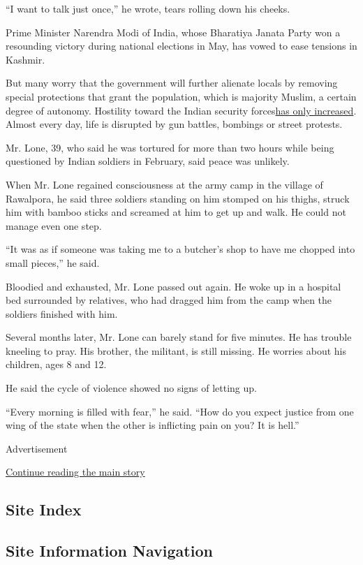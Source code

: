 ``I want to talk just once,'' he wrote, tears rolling down his cheeks.

Prime Minister Narendra Modi of India, whose Bharatiya Janata Party won
a resounding victory during national elections in May, has vowed to ease
tensions in Kashmir.

But many worry that the government will further alienate locals by
removing special protections that grant the population, which is
majority Muslim, a certain degree of autonomy. Hostility toward the
Indian security
forces\href{https://www.nytimes.com/2018/12/18/world/asia/kashmir-civilians-teenagers.html}{has
only increased}. Almost every day, life is disrupted by gun battles,
bombings or street protests.

Mr. Lone, 39, who said he was tortured for more than two hours while
being questioned by Indian soldiers in February, said peace was
unlikely.

When Mr. Lone regained consciousness at the army camp in the village of
Rawalpora, he said three soldiers standing on him stomped on his thighs,
struck him with bamboo sticks and screamed at him to get up and walk. He
could not manage even one step.

``It was as if someone was taking me to a butcher's shop to have me
chopped into small pieces,'' he said.

Bloodied and exhausted, Mr. Lone passed out again. He woke up in a
hospital bed surrounded by relatives, who had dragged him from the camp
when the soldiers finished with him.

Several months later, Mr. Lone can barely stand for five minutes. He has
trouble kneeling to pray. His brother, the militant, is still missing.
He worries about his children, ages 8 and 12.

He said the cycle of violence showed no signs of letting up.

``Every morning is filled with fear,'' he said. ``How do you expect
justice from one wing of the state when the other is inflicting pain on
you? It is hell.''

Advertisement

\protect\hyperlink{after-bottom}{Continue reading the main story}

\hypertarget{site-index}{%
\subsection{Site Index}\label{site-index}}

\hypertarget{site-information-navigation}{%
\subsection{Site Information
Navigation}\label{site-information-navigation}}

